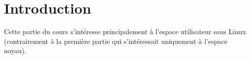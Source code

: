 
\chapter{Introduction} %

\label{Chapitre 1} %


Cette partie du cours s'intéresse principalement à l'espace utilisateur sous Linux (contrairement à la première partie qui s'intéressait uniquement à l'espace noyau).



















